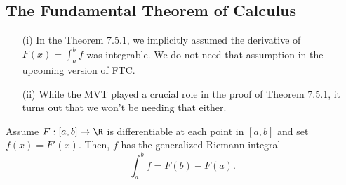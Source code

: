 \subsection{The Fundamental Theorem of Calculus}

\begin{enumerate}
    \item[(i)] In the Theorem 7.5.1, we implicitly assumed the derivative of \( F(x) = \int_{ a }^{ b } f  \) was integrable. We do not need that assumption in the upcoming version of FTC.
    \item[(ii)] While the MVT played a crucial role in the proof of Theorem 7.5.1, it turns out that we won't be needing that either.
\end{enumerate}

\begin{tcolorbox}
\begin{thm}
    Assume \( F: [a,b] \to \R  \) is differentiable at each point in \( [a,b]  \) and set \( f(x) = F'(x)  \). Then, \( f  \) has the generalized Riemann integral
    \[  \int_{ a }^{ b } f  = F(b) - F(a). \]
\end{thm}
\end{tcolorbox}

